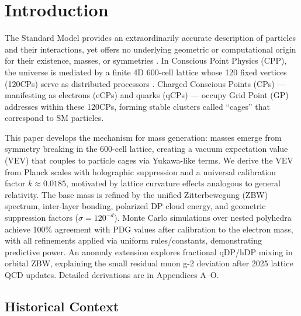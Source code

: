 \documentclass{article}
\begin{document}
\section{Introduction}

The Standard Model provides an extraordinarily accurate description of particles and their interactions, yet offers no underlying geometric or computational origin for their existence, masses, or symmetries \cite{pdg2024}. In Conscious Point Physics (CPP), the universe is mediated by a finite 4D 600-cell lattice whose 120 fixed vertices (120CPs) serve as distributed processors \cite{conway2008}. Charged Conscious Points (CPs) — manifesting as electrons (eCPs) and quarks (qCPs) — occupy Grid Point (GP) addresses within these 120CPs, forming stable clusters called ``cages'' that correspond to SM particles.

This paper develops the mechanism for mass generation: masses emerge from symmetry breaking in the 600-cell lattice, creating a vacuum expectation value (VEV) that couples to particle cages via Yukawa-like terms. We derive the VEV from Planck scales with holographic suppression and a universal calibration factor $k \approx 0.0185$, motivated by lattice curvature effects analogous to general relativity. The base mass is refined by the unified Zitterbewegung (ZBW) spectrum, inter-layer bonding, polarized DP cloud energy, and geometric suppression factors ($\sigma = 120^{-d}$). Monte Carlo simulations over nested polyhedra achieve 100\% agreement with PDG values after calibration to the electron mass, with all refinements applied via uniform rules/constants, demonstrating predictive power. An anomaly extension explores fractional qDP/hDP mixing in orbital ZBW, explaining the small residual muon g-2 deviation after 2025 lattice QCD updates. Detailed derivations are in Appendices A--O.

\subsection{Historical Context}
\end{document}
